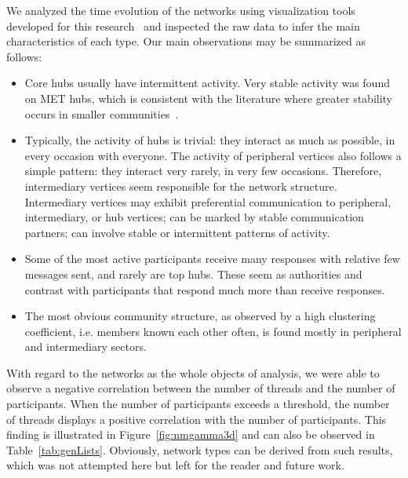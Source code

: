 \documentclass[%
	aip,
	jmp,%
	amsmath,amssymb,
	reprint,%
]{revtex4-1}
\begin{document}
We analyzed the time evolution of the networks using visualization tools developed for this research~\cite{rcText,versinus} and inspected the raw data to infer the main characteristics of each type. Our main observations may be summarized as follows:
\begin{itemize}
	\item Core hubs usually have intermittent activity. Very stable activity was found on MET hubs, which is consistent with the literature where greater stability occurs in smaller communities~\cite{barabasiEvo}.
	\item Typically, the activity of hubs is trivial: they interact as much as possible, in every occasion with everyone. The activity of peripheral vertices also follows a simple pattern: they interact very rarely, in very few occasions. Therefore, intermediary vertices seem responsible for the network structure. Intermediary vertices may exhibit preferential communication to peripheral, intermediary, or hub vertices; can be marked by stable communication partners; can involve stable or intermittent patterns of activity.
	\item Some of the most active participants receive many responses with relative few messages sent, and rarely are top hubs. These seem as authorities and contrast with participants that respond much more than receive responses.
	\item The most obvious community structure, as observed by a high clustering coefficient, i.e. members known each other often, is found mostly in peripheral and intermediary sectors.
\end{itemize}

With regard to the networks as the whole objects of analysis,
we were able to observe a negative correlation between the number of threads and the number of participants.
When the number of participants exceeds a threshold,
the number of threads displays a positive correlation with the number of participants.
This finding is illustrated in Figure~\ref{fig:nmgamma3d} and can also be observed in Table~\ref{tab:genLists}.
Obviously, network types can be derived from such results, which was not attempted here but 
left for the reader and future work. 
\end{document}
